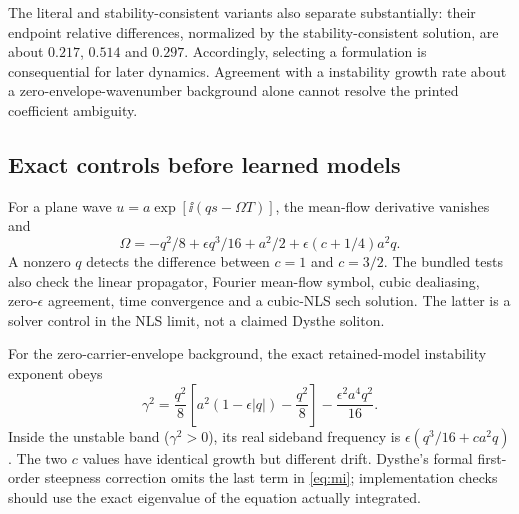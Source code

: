 The literal and stability-consistent variants also separate substantially: their endpoint relative differences, normalized by the stability-consistent solution, are about $0.217$, $0.514$ and $0.297$. Accordingly, selecting a formulation is consequential for later dynamics. Agreement with a instability growth rate about a zero-envelope-wavenumber background alone cannot resolve the printed coefficient ambiguity.

\subsection{Exact controls before learned models}
For a plane wave $u=a\exp[\ii(qs-\Omega T)]$, the mean-flow derivative vanishes and
\begin{equation}
 \Omega=-q^2/8+\epsilon q^3/16+a^2/2
       +\epsilon(c+1/4)a^2q.\label{eq:plane}
\end{equation}
A nonzero $q$ detects the difference between $c=1$ and $c=3/2$. The bundled tests also check the linear propagator, Fourier mean-flow symbol, cubic dealiasing, zero-$\epsilon$ agreement, time convergence and a cubic-NLS sech solution. The latter is a solver control in the NLS limit, not a claimed Dysthe soliton.

For the zero-carrier-envelope background, the exact retained-model instability exponent obeys
\begin{equation}
 \gamma^2=\frac{q^2}{8}\left[a^2(1-\epsilon|q|)-\frac{q^2}{8}\right]
                  -\frac{\epsilon^2a^4q^2}{16}.\label{eq:mi}
\end{equation}
Inside the unstable band ($\gamma^2>0$), its real sideband frequency is $\epsilon(q^3/16+ca^2q)$. The two $c$ values have identical growth but different drift. Dysthe's formal first-order steepness correction omits the last term in \eqref{eq:mi}; implementation checks should use the exact eigenvalue of the equation actually integrated.
